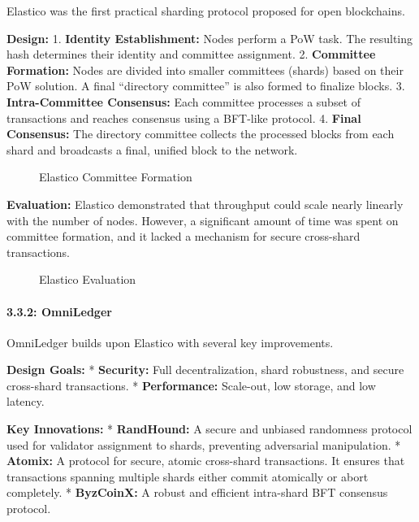 Elastico was the first practical sharding protocol proposed for open
blockchains.

\textbf{Design:} 1. \textbf{Identity Establishment:} Nodes perform a PoW
task. The resulting hash determines their identity and committee
assignment. 2. \textbf{Committee Formation:} Nodes are divided into
smaller committees (shards) based on their PoW solution. A final
``directory committee'' is also formed to finalize blocks. 3.
\textbf{Intra-Committee Consensus:} Each committee processes a subset of
transactions and reaches consensus using a BFT-like protocol. 4.
\textbf{Final Consensus:} The directory committee collects the processed
blocks from each shard and broadcasts a final, unified block to the
network.

\begin{figure}
\centering
\caption{Elastico Committee Formation}
\end{figure}

\textbf{Evaluation:} Elastico demonstrated that throughput could scale
nearly linearly with the number of nodes. However, a significant amount
of time was spent on committee formation, and it lacked a mechanism for
secure cross-shard transactions.

\begin{figure}
\centering
\caption{Elastico Evaluation}
\end{figure}

\paragraph{3.3.2: OmniLedger}\label{omniledger}

OmniLedger builds upon Elastico with several key improvements.

\textbf{Design Goals:} * \textbf{Security:} Full decentralization, shard
robustness, and secure cross-shard transactions. * \textbf{Performance:}
Scale-out, low storage, and low latency.

\textbf{Key Innovations:} * \textbf{RandHound:} A secure and unbiased
randomness protocol used for validator assignment to shards, preventing
adversarial manipulation. * \textbf{Atomix:} A protocol for secure,
atomic cross-shard transactions. It ensures that transactions spanning
multiple shards either commit atomically or abort completely. *
\textbf{ByzCoinX:} A robust and efficient intra-shard BFT consensus
protocol.

